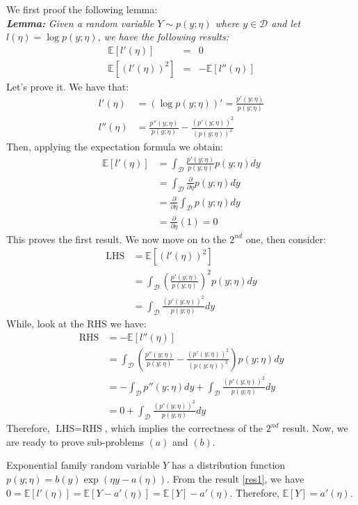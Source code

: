 \begin{answer}
We first proof the following lemma: \\
\textbf{\textit{Lemma:}} \textit{Given a random variable $Y \sim p(y; \eta)$ where $y \in \mathcal{D}$ and let $l(\eta) = \log p(y; \eta)$, we have the following results:}
\begin{eqnarray}
	\mathbb{E}[l'(\eta)] &=& 0 \label{res1}\\
	\mathbb{E}[(l'(\eta))^2] &=& - \mathbb{E}[l''(\eta)] \label{res2}
\end{eqnarray}
Let's prove it. We have that:
\begin{align} 
	l'(\eta) &= (\log p(y; \eta))' = \frac{p'(y; \eta)}{p(y; \eta)} \\
	l''(\eta) &= \frac{p''(y; \eta)}{p(y; \eta)} - \frac{(p'(y; \eta))^2}{(p(y; \eta))^2}
\end{align}
Then, applying the expectation formula we obtain:
\begin{align}
	\mathbb{E}[l'(\eta)] &= \int_\mathcal{D} \frac{p'(y; \eta)}{p(y; \eta)} p(y; \eta)dy \\
	&= \int_\mathcal{D} \frac{\partial}{\partial \eta} p(y; \eta) dy \\
	&= \frac{\partial}{\partial \eta} \int_\mathcal{D} p(y; \eta) dy \\
	&= \frac{\partial}{\partial \eta} (1) = 0
\end{align}
This proves the first result. We now move on to the $2^{nd}$ one, then consider:
\begin{align}
	\text{LHS} &= \mathbb{E}[(l'(\eta))^2] \\
	&= \int_\mathcal{D} \left( \frac{p'(y; \eta)}{p(y; \eta)} \right)^2 p(y; \eta) dy \\
	&= \int_\mathcal{D} \frac{(p'(y; \eta))^2}{p(y; \eta)} dy
\end{align}
While, look at the RHS we have:
\begin{align}
	\text{RHS} &= - \mathbb{E}[l''(\eta)] \\
	&= \int_\mathcal{D} \left( \frac{p''(y; \eta)}{p(y; \eta)} - \frac{(p'(y; \eta))^2}{(p(y; \eta))^2} \right) p(y; \eta) dy \\
	&= - \int_\mathcal{D} p''(y; \eta) dy +  \int_\mathcal{D} \frac{(p'(y; \eta))^2}{p(y; \eta)} dy \\
	&= 0 + \int_\mathcal{D} \frac{(p'(y; \eta))^2}{p(y; \eta)} dy
\end{align}
Therefore, $\text{LHS} = \text{RHS}$, which implies the correctness of the $2^{nd}$ result. Now, we are ready to prove sub-problems $(a)$ and $(b)$.

Exponential family random variable $Y$ has a distribution function $p(y; \eta) = b(y) \exp(\eta y - a(\eta))$.
From the result \eqref{res1}, we have $0 = \mathbb{E}[l'(\eta)] = \mathbb{E}[Y - a'(\eta)] = \mathbb{E}[Y] - a'(\eta)$. Therefore, $\mathbb{E}[Y] = a'(\eta)$. \\
\end{answer}
